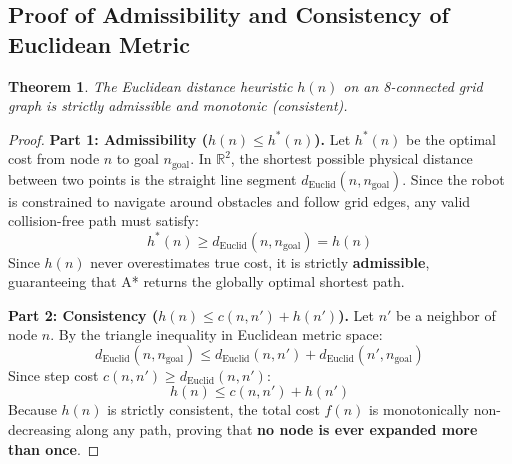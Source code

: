 \documentclass[11pt, a4paper]{article}
\newtheorem{theorem}{Theorem}[section]
\begin{document}
\subsection{Proof of Admissibility and Consistency of Euclidean Metric}
\begin{theorem}
The Euclidean distance heuristic $h(n)$ on an 8-connected grid graph is strictly admissible and monotonic (consistent).
\end{theorem}

\begin{proof}
\textbf{Part 1: Admissibility ($h(n) \le h^*(n)$).}  
Let $h^*(n)$ be the optimal cost from node $n$ to goal $n_{\text{goal}}$. In $\mathbb{R}^2$, the shortest possible physical distance between two points is the straight line segment $d_{\text{Euclid}}(n, n_{\text{goal}})$. Since the robot is constrained to navigate around obstacles and follow grid edges, any valid collision-free path must satisfy:
\begin{equation}
    h^*(n) \ge d_{\text{Euclid}}(n, n_{\text{goal}}) = h(n)
\end{equation}
Since $h(n)$ never overestimates true cost, it is strictly \textbf{admissible}, guaranteeing that A* returns the globally optimal shortest path.

\textbf{Part 2: Consistency ($h(n) \le c(n, n') + h(n')$).}  
Let $n'$ be a neighbor of node $n$. By the triangle inequality in Euclidean metric space:
\begin{equation}
    d_{\text{Euclid}}(n, n_{\text{goal}}) \le d_{\text{Euclid}}(n, n') + d_{\text{Euclid}}(n', n_{\text{goal}})
\end{equation}
Since step cost $c(n, n') \ge d_{\text{Euclid}}(n, n')$:
\begin{equation}
    h(n) \le c(n, n') + h(n')
\end{equation}
Because $h(n)$ is strictly consistent, the total cost $f(n)$ is monotonically non-decreasing along any path, proving that \textbf{no node is ever expanded more than once}.
\end{proof}
\end{document}
